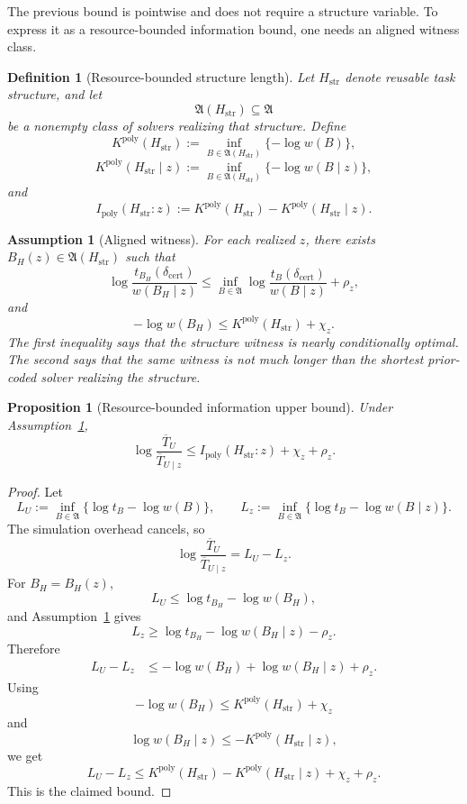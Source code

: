 \documentclass{article}
\newtheorem{assumption}{Assumption}
\newtheorem{definition}{Definition}
\newtheorem{proposition}{Proposition}
\begin{document}
The previous bound is pointwise and does not require a structure variable.
To express it as a resource-bounded information bound, one needs an aligned witness class.

\begin{definition}[Resource-bounded structure length]
\label{def:app-ipoly}
Let \(H_{\mathrm{str}}\) denote reusable task structure, and let
\[
    \mathfrak A(H_{\mathrm{str}})\subseteq \mathfrak A
\]
be a nonempty class of solvers realizing that structure.  Define
\[
    K^{\mathrm{poly}}(H_{\mathrm{str}})
    :=
    \inf_{B\in\mathfrak A(H_{\mathrm{str}})}
    \{-\log w(B)\},
\]
\[
    K^{\mathrm{poly}}(H_{\mathrm{str}}\mid z)
    :=
    \inf_{B\in\mathfrak A(H_{\mathrm{str}})}
    \{-\log w(B\mid z)\},
\]
and
\[
    I_{\mathrm{poly}}(H_{\mathrm{str}}:z)
    :=
    K^{\mathrm{poly}}(H_{\mathrm{str}})
    -
    K^{\mathrm{poly}}(H_{\mathrm{str}}\mid z).
\]
\end{definition}

\begin{assumption}[Aligned witness]
\label{ass:app-aligned-witness}
For each realized \(z\), there exists
\(B_H(z)\in\mathfrak A(H_{\mathrm{str}})\) such that
\[
    \log\frac{t_{B_H}(\delta_{\mathrm{cert}})}{w(B_H\mid z)}
    \le
    \inf_{B\in\mathfrak A}
    \log\frac{t_B(\delta_{\mathrm{cert}})}{w(B\mid z)}
    +
    \rho_z,
\]
and
\[
    -\log w(B_H)
    \le
    K^{\mathrm{poly}}(H_{\mathrm{str}})+\chi_z.
\]
The first inequality says that the structure witness is nearly conditionally optimal.
The second says that the same witness is not much longer than the shortest prior-coded
solver realizing the structure.
\end{assumption}

\begin{proposition}[Resource-bounded information upper bound]
\label{prop:app-ipoly-bound}
Under Assumption~\ref{ass:app-aligned-witness},
\[
    \log\frac{\overline T_U}{\overline T_{U\mid z}}
    \le
    I_{\mathrm{poly}}(H_{\mathrm{str}}:z)+\chi_z+\rho_z.
\]
\end{proposition}

\begin{proof}
Let
\[
    L_U:=\inf_{B\in\mathfrak A}\{\log t_B-\log w(B)\},
    \qquad
    L_z:=\inf_{B\in\mathfrak A}\{\log t_B-\log w(B\mid z)\}.
\]
The simulation overhead cancels, so
\[
    \log\frac{\overline T_U}{\overline T_{U\mid z}}
    =
    L_U-L_z.
\]
For \(B_H=B_H(z)\),
\[
    L_U
    \le
    \log t_{B_H}-\log w(B_H),
\]
and Assumption~\ref{ass:app-aligned-witness} gives
\[
    L_z
    \ge
    \log t_{B_H}-\log w(B_H\mid z)-\rho_z.
\]
Therefore
\[
\begin{aligned}
    L_U-L_z
    &\le
    -\log w(B_H)+\log w(B_H\mid z)+\rho_z.
\end{aligned}
\]
Using
\[
    -\log w(B_H)
    \le
    K^{\mathrm{poly}}(H_{\mathrm{str}})+\chi_z
\]
and
\[
    \log w(B_H\mid z)
    \le
    -K^{\mathrm{poly}}(H_{\mathrm{str}}\mid z),
\]
we get
\[
    L_U-L_z
    \le
    K^{\mathrm{poly}}(H_{\mathrm{str}})
    -
    K^{\mathrm{poly}}(H_{\mathrm{str}}\mid z)
    +
    \chi_z+\rho_z.
\]
This is the claimed bound.
\end{proof}
\end{document}
